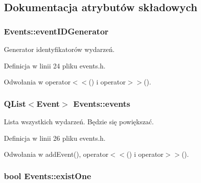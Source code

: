 \subsection{Dokumentacja atrybutów składowych}
\hypertarget{classEvents_aee8768258412e3f8d298a539e038169c}{
\subsubsection[{eventIDGenerator}]{ {\bf Events::eventIDGenerator}}}
\label{classEvents_aee8768258412e3f8d298a539e038169c}


Generator identyfikatorów wydarzeń. 



Definicja w linii 24 pliku events.h.



Odwołania w operator$<$$<$() i operator$>$$>$().

\hypertarget{classEvents_a38bc398f90e69e671e7411bf73cf3fc0}{
\subsubsection[{events}]{\setlength{\rightskip}{0pt plus 5cm}QList$<${\bf Event}$>$ {\bf Events::events}}}
\label{classEvents_a38bc398f90e69e671e7411bf73cf3fc0}


Lista wszystkich wydarzeń. Będzie się powiększać. 



Definicja w linii 26 pliku events.h.



Odwołania w addEvent(), operator$<$$<$() i operator$>$$>$().

\hypertarget{classEvents_a5b2f7b7d038ce9447080499b0736c4fe}{
\subsubsection[{existOne}]{\setlength{\rightskip}{0pt plus 5cm}bool {\bf Events::existOne}}}
\label{classEvents_a5b2f7b7d038ce9447080499b0736c4fe}


